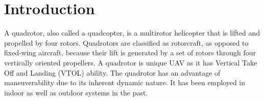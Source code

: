 \documentclass[hidelinks,BTech]{iitmdiss}
\begin{document}

\begin{singlespace}
\clearpage
{}
{}
\tableofcontents


\listoffigures
{}
\end{singlespace}








\clearpage




\chapter{Introduction}
A quadrotor, also called a quadcopter, is a multirotor helicopter that is lifted and propelled by four rotors. Quadrotors are classified as rotorcraft, as opposed to fixed-wing aircraft, because their lift is generated by a set of rotors through four vertically oriented propellers. A quadrotor is unique UAV as it has Vertical Take Off and Landing (VTOL) ability. The quadrotor has an advantage of maneuverability due to its inherent dynamic nature. It has been employed in indoor\cite{IndoorQuad} as well as outdoor systems\cite{OutdoorQuad} in the past.
\end{document}

